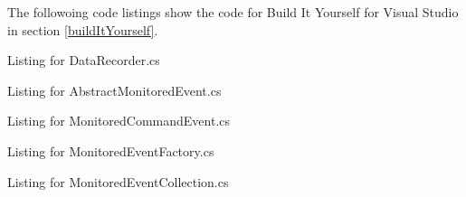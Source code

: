 The followoing code listings show the code for Build It Yourself for Visual Studio in section \ref{buildItYourself}.

Listing for DataRecorder.cs


\newpage
Listing for AbstractMonitoredEvent.cs


\newpage
Listing for MonitoredCommandEvent.cs


\newpage
Listing for MonitoredEventFactory.cs

\newpage
Listing for MonitoredEventCollection.cs


